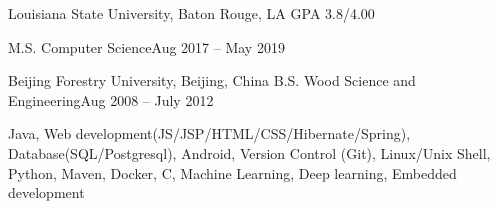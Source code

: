\documentclass[10pt,a4paper]{article}
\begin{document}
        


\spacedhrule{0em}{-0.8em}


\headedsection
{Louisiana State University, Baton Rouge, LA}
{GPA 3.8/4.00}{

  \headedsubsection
  {M.S. Computer Science}{Aug 2017
    -- May 2019}{}
}
\vspace{0.1em}
\headedsection
{Beijing Forestry University, Beijing, China}{
	\headedsubsection
  {B.S. Wood Science and Engineering}{Aug 2008 -- July 2012}{}
}


\spacedhrule{0.1em}{-0.8em}
Java, Web development(JS/JSP/HTML/CSS/Hibernate/Spring),   Database(SQL/Postgresql), Android, Version Control (Git), Linux/Unix Shell, Python, Maven, Docker, C, Machine Learning, Deep learning, Embedded development
  
\end{document}

